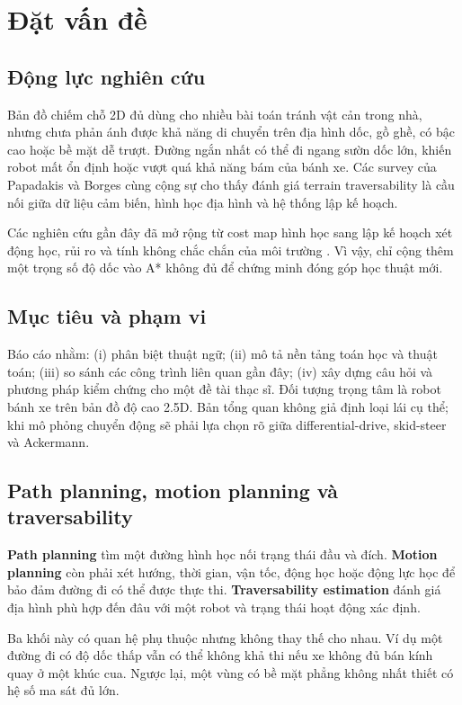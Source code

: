 \documentclass[11pt,a4paper]{article}
\begin{document}
\section{Đặt vấn đề}
\subsection{Động lực nghiên cứu}
Bản đồ chiếm chỗ 2D đủ dùng cho nhiều bài toán tránh vật cản trong nhà,
nhưng chưa phản ánh được khả năng di chuyển trên địa hình dốc, gồ ghề,
có bậc cao hoặc bề mặt dễ trượt. Đường ngắn nhất có thể đi ngang sườn dốc
lớn, khiến robot mất ổn định hoặc vượt quá khả năng bám của bánh xe.
Các survey của Papadakis \cite{papadakis2013terrain} và Borges cùng cộng sự
\cite{borges2022survey} cho thấy đánh giá terrain traversability
là cầu nối giữa dữ liệu cảm biến, hình học địa hình và hệ thống lập kế hoạch.

Các nghiên cứu gần đây đã mở rộng từ cost map hình học sang lập kế hoạch
xét động học, rủi ro và tính không chắc chắn của môi trường
\cite{benrabah2024risk,wang2026winter}.
Vì vậy, chỉ cộng thêm một trọng số độ dốc vào A* không đủ để chứng minh
đóng góp học thuật mới.

\subsection{Mục tiêu và phạm vi}
Báo cáo nhằm: (i) phân biệt thuật ngữ; (ii) mô tả nền tảng
toán học và thuật toán; (iii) so sánh các công trình liên quan gần đây;
(iv) xây dựng câu hỏi và phương pháp kiểm chứng cho một đề tài thạc sĩ.
Đối tượng trọng tâm là robot bánh xe trên bản đồ độ cao 2.5D.
Bản tổng quan không giả định loại lái cụ thể; khi mô phỏng chuyển động
sẽ phải lựa chọn rõ giữa differential-drive, skid-steer và Ackermann.

\subsection{Path planning, motion planning và traversability}
\textbf{Path planning} tìm một đường hình học nối trạng thái đầu và đích.
\textbf{Motion planning} còn phải xét hướng, thời gian, vận tốc,
động học hoặc động lực học để bảo đảm đường đi có thể được thực thi.
\textbf{Traversability estimation} đánh giá địa hình phù hợp đến đâu
với một robot và trạng thái hoạt động xác định.

Ba khối này có quan hệ phụ thuộc nhưng không thay thế cho nhau.
Ví dụ một đường đi có độ dốc thấp vẫn có thể không khả thi
nếu xe không đủ bán kính quay ở một khúc cua. Ngược lại,
một vùng có bề mặt phẳng không nhất thiết có hệ số ma sát đủ lớn.
\end{document}
